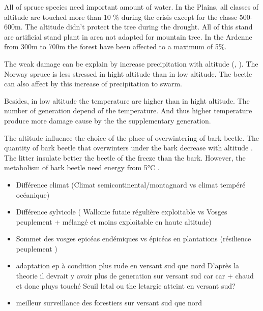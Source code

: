\documentclass[3p,procedia]{elsarticle}
\begin{document}
 






All of spruce species need important amount of water. 
In the Plains, all classes of altitude are touched more than 10 \% during the crisis except for the classe 500-600m. 
The altitude didn't protect the tree during the drought. 
All of this stand are artificial stand plant in area not adapted for mountain tree. In the Ardenne from 300m to 700m the forest have been affected to a maximum of 5\%. 

The weak damage can be explain by increase precipitation with altitude (\cite{kotlarski_elevation_2012}, \cite{Roe_orographic_preicpitation_2005}).
The Norway spruce is less stressed in hight altitude than in low altitude. 
The beetle can also affect by this increase of precipitation to swarm. 

Besides, in low altitude the temperature are higher than in hight altitude. 
The number of generation depend of the temperature.
And thus higher temperature produce more damage cause by the the supplementary generation. 

The altitude influence the choice of the place of overwintering of  bark beetle.
The quantity of bark beetle that overwinters under the bark decrease with altitude \citep{kasumovic_overwintering_2019}.
The litter insulate better the beetle of the freeze \citep{lombardero_cold_2000} than the bark.
However, the metabolism of bark beetle need energy from 5°C  \citep{kostal_physiological_2011}.





\begin{itemize}
	\item Différence climat (Climat semicontinental/montagnard vs climat tempéré océanique)
	\item Différence sylvicole ( Wallonie futaie régulière exploitable vs Vosges peuplement + mélangé et moins exploitable en haute altitude)
	\item Sommet des vosges epicéas endémiques vs épicéas en plantations (résilience peuplement )
	\item adaptation ep à condition plus rude en versant sud que nord 
	D'après la theorie il devrait y avoir plus de generation sur versant sud car car + chaud et donc pluys touché
	Seuil letal ou the letargie atteint en versant sud?
\item meilleur surveillance des forestiers sur versant sud que nord 
	
\end{itemize}
\end{document}
